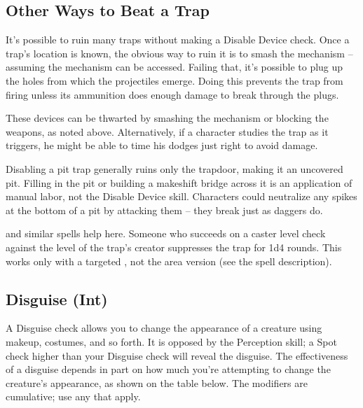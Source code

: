 \begin{figure*}[hbt!]
\subsection{Other Ways to Beat a Trap}
It's possible to ruin many traps without making a Disable Device check.
 Once a trap's location is known, the obvious way to ruin it is to smash the mechanism -- assuming the mechanism can be accessed. Failing that, it's possible to plug up the holes from which the projectiles emerge. Doing this prevents the trap from firing unless its ammunition does enough damage to break through the plugs.

 These devices can be thwarted by smashing the mechanism or blocking the weapons, as noted above. Alternatively, if a character studies the trap as it triggers, he might be able to time his dodges just right to avoid damage.

 Disabling a pit trap generally ruins only the trapdoor, making it an uncovered pit. Filling in the pit or building a makeshift bridge across it is an application of manual labor, not the Disable Device skill. Characters could neutralize any spikes at the bottom of a pit by attacking them -- they break just as daggers do.

  and similar spells help here. Someone who succeeds on a caster level check against the level of the trap's creator suppresses the trap for 1d4 rounds. This works only with a targeted , not the area version (see the spell description).
\end{figure*}

\subsection{Disguise (Int)}
 A Disguise check allows you to change the appearance of a creature using makeup, costumes, and so forth. It is opposed by the Perception skill; a Spot check higher than your Disguise check will reveal the disguise. The effectiveness of a disguise depends in part on how much you're attempting to change the creature's appearance, as shown on the table below. The modifiers are cumulative; use any that apply.

